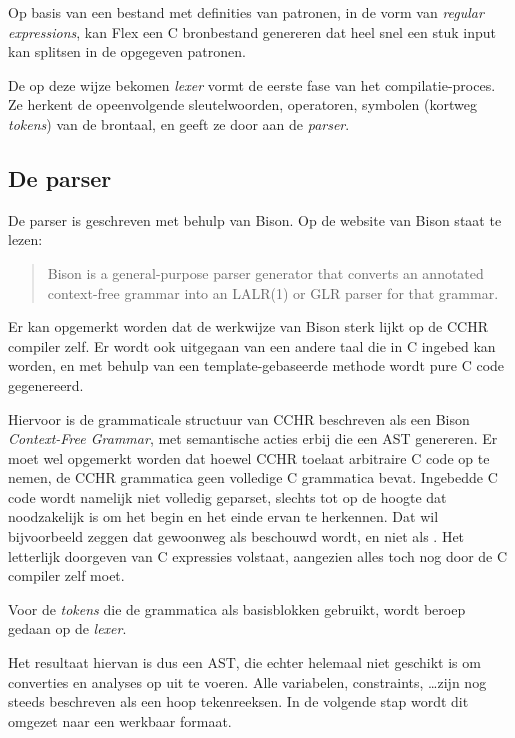 Op basis van een bestand met definities van patronen, in de vorm van {\em regular expressions}, kan Flex een C bronbestand genereren dat heel snel een stuk input kan splitsen in de opgegeven patronen. 

De op deze wijze bekomen {\em lexer} vormt de eerste fase van het compilatie-proces. Ze herkent de opeenvolgende sleutelwoorden, operatoren, symbolen (kortweg {\em tokens}) van de brontaal, en geeft ze door aan de {\em parser}.

\subsection{De parser} \label{sec:parser}

De parser is geschreven met behulp van Bison. Op de website van Bison staat te lezen: \begin{quote}
  Bison is a general-purpose parser generator that converts an annotated context-free grammar into an LALR(1) or GLR parser for that grammar.
\end{quote}

Er kan opgemerkt worden dat de werkwijze van Bison sterk lijkt op de CCHR compiler zelf. Er wordt ook uitgegaan van een andere taal die in C ingebed kan worden, en met behulp van een template-gebaseerde methode wordt pure C code gegenereerd.

Hiervoor is de grammaticale structuur van CCHR beschreven als een Bison {\em Context-Free Grammar}, met semantische acties erbij die een AST genereren. Er moet wel opgemerkt worden dat hoewel CCHR toelaat arbitraire C code op te nemen, de CCHR grammatica geen volledige C grammatica bevat. Ingebedde C code wordt namelijk niet volledig geparset, slechts tot op de hoogte dat noodzakelijk is om het begin en het einde ervan te herkennen. Dat wil bijvoorbeeld zeggen dat  gewoonweg als  beschouwd wordt, en niet als . Het letterlijk doorgeven van C expressies volstaat, aangezien alles toch nog door de C compiler zelf moet.

Voor de {\em tokens} die de grammatica als basisblokken gebruikt, wordt beroep gedaan op de {\em lexer}.

Het resultaat hiervan is dus een AST, die echter helemaal niet geschikt is om converties en analyses op uit te voeren. Alle variabelen, constraints, \ldots zijn nog steeds beschreven als een hoop tekenreeksen. In de volgende stap wordt dit omgezet naar een werkbaar formaat. 


